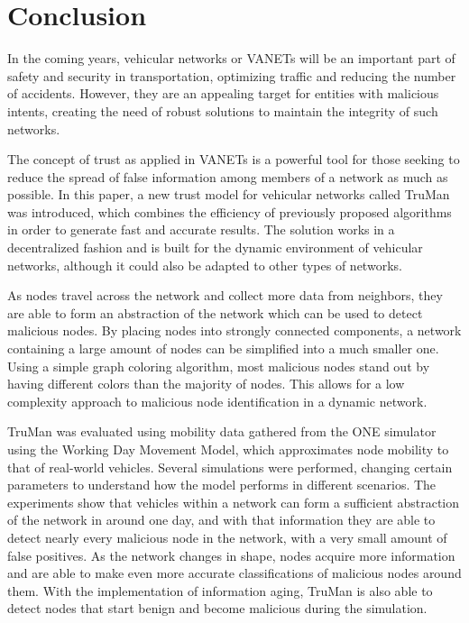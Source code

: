 \chapter{Conclusion}
\label{chap:conclusion}

In the coming years, vehicular networks or VANETs will be an important part of safety and security in transportation, optimizing traffic and reducing the number of accidents.
However, they are an appealing target for entities with malicious intents, creating the need of robust solutions to maintain the integrity of such networks.

The concept of trust as applied in VANETs is a powerful tool for those seeking to reduce the spread of false information among members of a network as much as possible.
In this paper, a new trust model for vehicular networks called TruMan was introduced, which combines the efficiency of previously proposed algorithms in order to generate fast and accurate results.
The solution works in a decentralized fashion and is built for the dynamic environment of vehicular networks, although it could also be adapted to other types of networks.

As nodes travel across the network and collect more data from neighbors, they are able to form an abstraction of the network which can be used to detect malicious nodes.
By placing nodes into strongly connected components, a network containing a large amount of nodes can be simplified into a much smaller one.
Using a simple graph coloring algorithm, most malicious nodes stand out by having different colors than the majority of nodes.
This allows for a low complexity approach to malicious node identification in a dynamic network.

TruMan was evaluated using mobility data gathered from the ONE simulator using the Working Day Movement Model, which approximates node mobility to that of real-world vehicles.
Several simulations were performed, changing certain parameters to understand how the model performs in different scenarios.
The experiments show that vehicles within a network can form a sufficient abstraction of the network in around one day, and with that information they are able to detect nearly every malicious node in the network, with a very small amount of false positives.
As the network changes in shape, nodes acquire more information and are able to make even more accurate classifications of malicious nodes around them.
With the implementation of information aging, TruMan is also able to detect nodes that start benign and become malicious during the simulation.

